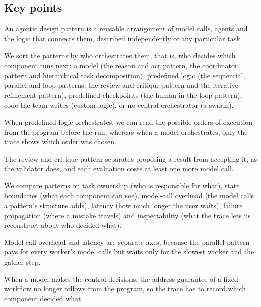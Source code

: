\subsection*{Key points}
\bi
\item An agentic design pattern is a reusable arrangement of model calls, agents and the logic that
connects them, described independently of any particular task.
\item We sort the patterns by who orchestrates them, that is, who decides which component runs
next: a model (the reason and act pattern, the coordinator pattern and hierarchical task
decomposition), predefined logic (the sequential, parallel and loop patterns, the review and
critique pattern and the iterative refinement pattern), predefined checkpoints (the
human-in-the-loop pattern), code the team writes (custom logic), or no central orchestrator (a
swarm).
\item When predefined logic orchestrates, we can read the possible orders of execution from the
program before the run, whereas when a model orchestrates, only the trace shows which order was
chosen.
\item The review and critique pattern separates proposing a result from accepting it, as the
validator does, and each evaluation costs at least one more model call.
\item We compare patterns on task ownership (who is responsible for what), state boundaries (what
each component can see), model-call overhead (the model calls a pattern's structure adds), latency
(how much longer the user waits), failure propagation (where a mistake travels) and inspectability
(what the trace lets us reconstruct about who decided what).
\item Model-call overhead and latency are separate axes, because the parallel pattern pays for every
worker's model calls but waits only for the slowest worker and the gather step.
\item When a model makes the control decisions, the address guarantee of a fixed workflow no longer
follows from the program, so the trace has to record which component decided what.
\ei
